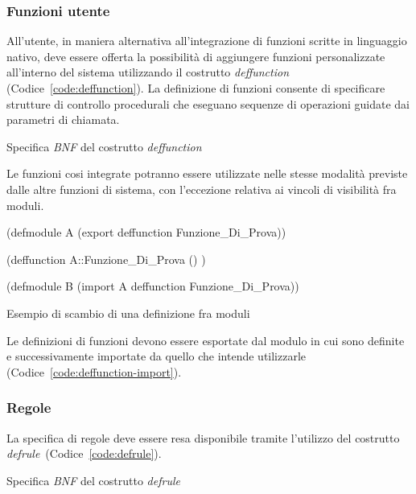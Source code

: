 \subsubsection{Funzioni utente}\label{par:linguaggio-funzioni}
All'utente, in maniera alternativa all'integrazione di funzioni scritte in linguaggio nativo, deve essere offerta la possibilità di aggiungere funzioni personalizzate all'interno del sistema utilizzando il costrutto \emph{deffunction} (Codice~\ref{code:deffunction}). La definizione di funzioni consente di specificare strutture di controllo procedurali che eseguano sequenze di operazioni guidate dai parametri di chiamata.

\begin{program}
\caption{Specifica \emph{BNF} del costrutto \emph{deffunction}}\label{code:deffunction}
\end{program}


Le funzioni cosi integrate potranno essere utilizzate nelle stesse modalità previste dalle altre funzioni di sistema, con l'eccezione relativa ai vincoli di visibilità fra moduli.

\begin{program}
\begin{verbatimtab}

(defmodule A
	(export deffunction Funzione_Di_Prova))
	
(deffunction A::Funzione_Di_Prova () )

(defmodule B
	(import A deffunction Funzione_Di_Prova))
\end{verbatimtab}
\caption{Esempio di scambio di una definizione fra moduli}\label{code:deffunction-import}
\end{program}

Le definizioni di funzioni devono essere esportate dal modulo in cui sono definite e successivamente importate da quello che intende utilizzarle (Codice~\ref{code:deffunction-import}).

\subsubsection{Regole}\label{par:linguaggio-regole}
La specifica di regole deve essere resa disponibile tramite l'utilizzo del costrutto \emph{defrule}~(Codice~\ref{code:defrule}).

\begin{program}
\caption{Specifica \emph{BNF} del costrutto \emph{defrule}}\label{code:defrule}
\end{program}


